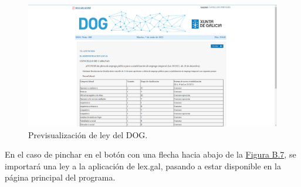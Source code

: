 \begin{figure}[H]
\centerline{\includegraphics[width=12cm]{figuras/manualUsuario/PrevisualizarDOG.PNG}}
\caption{Previsualización de ley del DOG.}
\label{enlacePrevisDOG}
\end{figure}

En el caso de pinchar en el botón con una flecha hacia abajo de la \hyperref[enlacePrevisDOG]{Figura B.7}, se importará una ley a la aplicación de lex.gal, pasando a estar disponible en la página principal del programa.